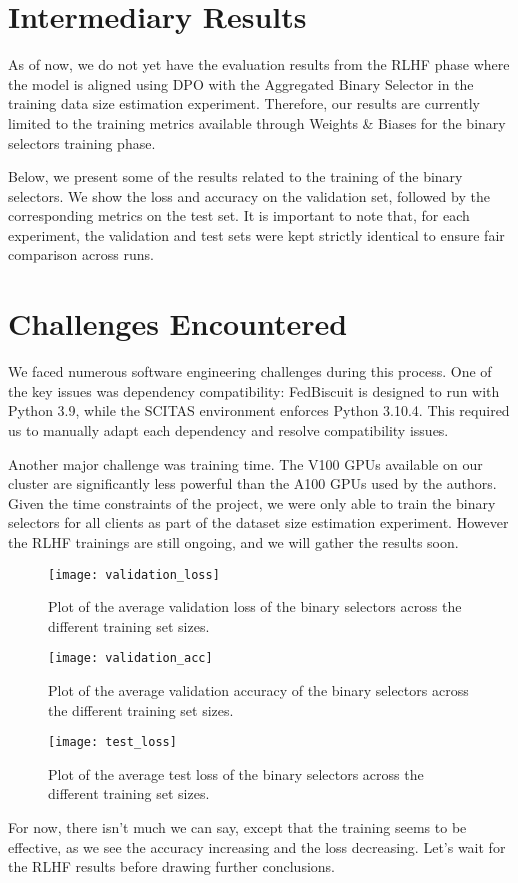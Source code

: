 \section{Intermediary Results}

As of now, we do not yet have the evaluation results from the RLHF phase where the model is aligned using DPO with the Aggregated Binary Selector in the training data size estimation experiment. Therefore, our results are currently limited to the training metrics available through Weights \& Biases for the binary selectors training phase.

Below, we present some of the results related to the training of the binary selectors. We show the loss and accuracy on the validation set, followed by the corresponding metrics on the test set.  
It is important to note that, for each experiment, the validation and test sets were kept strictly identical to ensure fair comparison across runs.


\section{Challenges Encountered}

We faced numerous software engineering challenges during this process. One of the key issues was dependency compatibility: FedBiscuit is designed to run with Python 3.9, while the SCITAS environment enforces Python 3.10.4. This required us to manually adapt each dependency and resolve compatibility issues.

Another major challenge was training time. The V100 GPUs available on our cluster are significantly less powerful than the A100 GPUs used by the authors. Given the time constraints of the project, we were only able to train the binary selectors for all clients as part of the dataset size estimation experiment. However the RLHF trainings are still ongoing, and we will gather the results soon.

\begin{figure*}[h!]
	\texttt{[image: validation\_loss]}
  \caption{Plot of the average validation loss of the binary selectors across the different training set sizes.}
  \label{fig:v1}
\end{figure*}

\begin{figure*}[h!]
	\texttt{[image: validation\_acc]}
  \caption{Plot of the average validation accuracy of the binary selectors across the different training set sizes.}
  \label{fig:v2}
\end{figure*}

\begin{figure*}[h!]
	\texttt{[image: test\_loss]}
  \caption{Plot of the average test loss of the binary selectors across the different training set sizes.}
  \label{fig:t1}
\end{figure*}

For now, there isn’t much we can say, except that the training seems to be effective, as we see the accuracy increasing and the loss decreasing. Let’s wait for the RLHF results before drawing further conclusions.